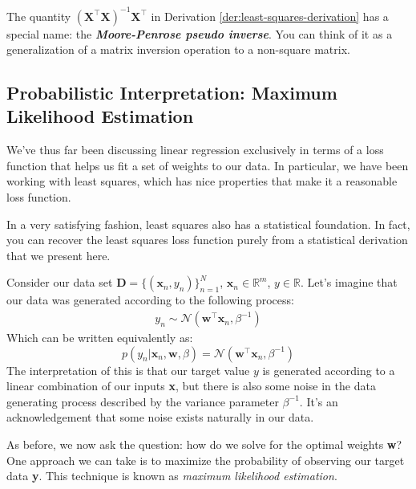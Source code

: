 The quantity $(\textbf{X}^\top\textbf{X})^{-1}\textbf{X}^\top$ in Derivation \ref{der:least-squares-derivation} has a special name: the \textbf{\textit{Moore-Penrose pseudo inverse}}. You can think of it as a generalization of a matrix inversion operation to a non-square matrix.

\subsection{Probabilistic Interpretation: Maximum Likelihood Estimation}
We've thus far been discussing linear regression exclusively in terms of a loss function that helps us fit a set of weights to our data. In particular, we have been working with least squares, which has nice properties that make it a reasonable loss function.

In a very satisfying fashion, least squares also has a statistical foundation. In fact, you can recover the least squares loss function purely from a statistical derivation that we present here.

Consider our data set $\textbf{D} = \{(\textbf{x}_{n}, y_{n})\}_{n = 1}^{N}$, $\textbf{x}_{n} \in\mathbb{R}^m$, $y \in\mathbb{R}$. Let's imagine that our data was generated according to the following process:
\begin{align*}
    y_{n} \sim \mathcal{N}(\textbf{w}^\top\textbf{x}_{n}, \beta^{-1})
\end{align*}
Which can be written equivalently as:
\begin{equation} \label{normal-over-w}
    p(y_{n} | \textbf{x}_{n}, \textbf{w}, \beta) = \mathcal{N}(\textbf{w}^\top\textbf{x}_{n}, \beta^{-1})
\end{equation}
The interpretation of this is that our target value $y$ is generated according to a linear combination of our inputs \textbf{x}, but there is also some noise in the data generating process described by the variance parameter $\beta^{-1}$. It's an acknowledgement that some noise exists naturally in our data.


As before, we now ask the question: how do we solve for the optimal weights \textbf{w}? One approach we can take is to maximize the probability of observing our target data \textbf{y}. This technique is known as \textit{maximum likelihood estimation}.

